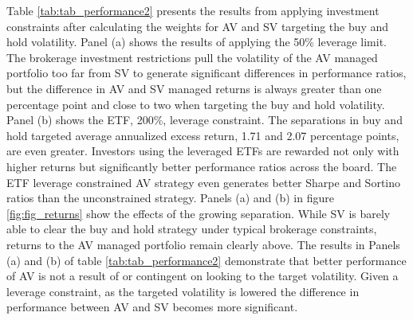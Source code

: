 Table \ref{tab:tab_performance2} presents the results from applying investment constraints after calculating the weights for AV and SV targeting the buy and hold volatility. Panel (a) shows the results of applying the 50\% leverage limit. The brokerage investment restrictions pull the volatility of the AV managed portfolio too far from SV to generate significant differences in performance ratios, but the difference in AV and SV managed returns is always greater than one percentage point and close to two when targeting the buy and hold volatility. Panel (b) shows the ETF, 200\%, leverage constraint. The separations in buy and hold targeted average annualized excess return, 1.71 and 2.07 percentage points, are even greater. Investors using the leveraged ETFs are rewarded not only with higher returns but significantly better performance ratios across the board. The ETF leverage constrained AV strategy even generates better Sharpe and Sortino ratios than the unconstrained strategy. Panels (a) and (b) in figure \ref{fig:fig_returns} show the effects of the growing separation. While SV is barely able to clear the buy and hold strategy under typical brokerage constraints, returns to the AV managed portfolio remain clearly above.  %
The results in Panels (a) and (b) of table \ref{tab:tab_performance2} demonstrate that better performance of AV is not a result of or contingent on looking to the target volatility. Given a leverage constraint, as the targeted volatility is lowered the difference in performance between AV and SV becomes more significant.

